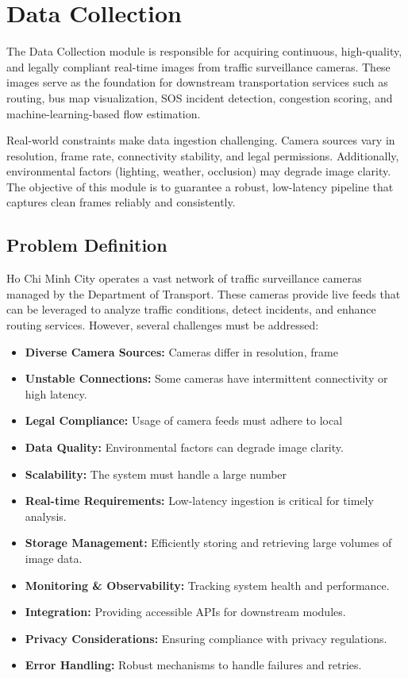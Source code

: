 \chapter{Data Collection}
\label{chap:data-collection}

The Data Collection module is responsible for acquiring continuous, high-quality, and legally compliant real-time images from traffic surveillance cameras. These images serve as the foundation for downstream transportation services such as routing, bus map visualization, SOS incident detection, congestion scoring, and machine-learning-based flow estimation.

Real-world constraints make data ingestion challenging. Camera sources vary in resolution, frame rate, connectivity stability, and legal permissions. Additionally, environmental factors (lighting, weather, occlusion) may degrade image clarity. The objective of this module is to guarantee a robust, low-latency pipeline that captures clean frames reliably and consistently.

\section{Problem Definition}
Ho Chi Minh City operates a vast network of traffic surveillance cameras managed by the Department of Transport. These cameras provide live feeds that can be leveraged to analyze traffic conditions, detect incidents, and enhance routing services. However, several challenges must be addressed:
\begin{itemize}
    \item \textbf{Diverse Camera Sources:} Cameras differ in resolution, frame
    \item \textbf{Unstable Connections:} Some cameras have intermittent connectivity or high latency.
    \item \textbf{Legal Compliance:} Usage of camera feeds must adhere to local
    \item \textbf{Data Quality:} Environmental factors can degrade image clarity.
    \item \textbf{Scalability:} The system must handle a large number
    \item \textbf{Real-time Requirements:} Low-latency ingestion is critical for timely analysis.
    \item \textbf{Storage Management:} Efficiently storing and retrieving large volumes of image data.
    \item \textbf{Monitoring \& Observability:} Tracking system health and performance.
    \item \textbf{Integration:} Providing accessible APIs for downstream modules.
    \item \textbf{Privacy Considerations:} Ensuring compliance with privacy regulations.
    \item \textbf{Error Handling:} Robust mechanisms to handle failures and retries.
\end{itemize}

